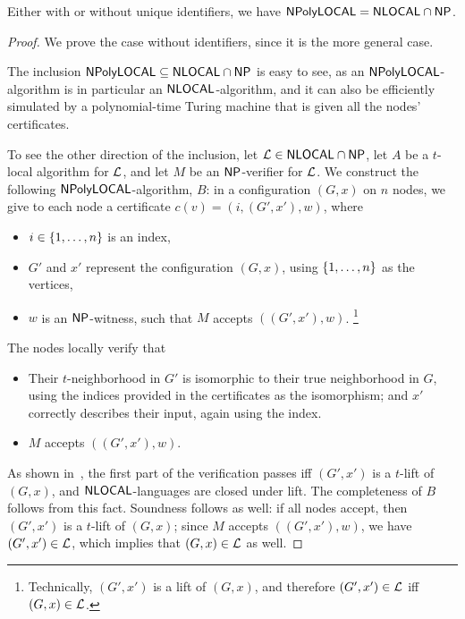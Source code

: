 \begin{theorem}
	Either with or without unique identifiers,
	we have $\mathsf{NPolyLOCAL} = {\mathsf{NLOCAL}} \cap {\mathsf{NP}}$.
	\label{thm:NPLD}
\end{theorem}
\begin{proof}
	We prove the case without identifiers, since it is the more general case.

	The inclusion $\mathsf{NPolyLOCAL} \subseteq {\mathsf{NLOCAL}} \cap {\mathsf{NP}}$
	is easy to see, as an $\mathsf{NPolyLOCAL}$-algorithm is in particular an ${\mathsf{NLOCAL}}$-algorithm,
	and it can also be efficiently simulated by a polynomial-time Turing machine that is given all the nodes' certificates.

	To see the other direction of the inclusion, let $\mathcal{L} \in {\mathsf{NLOCAL}} \cap {\mathsf{NP}}$,
	let $A$ be a $t$-local algorithm for $\mathcal{L}$, and let $M$ be an ${\mathsf{NP}}$-verifier for $\mathcal{L}$.
	We construct the following $\mathsf{NPolyLOCAL}$-algorithm, $B$:
	in a configuration $(G, x)$ on $n$ nodes,
	we give to each node a certificate $c(v) = ( i, (G', x'), w)$,
	where
	\begin{itemize}
		\item $i \in \left \{{1,\ldots,n} \right \}$ is an index,
		\item $G'$ and $x'$ represent the configuration $(G,x)$, using $\left \{{1,\ldots,n} \right \}$ as the vertices,
		\item $w$ is an ${\mathsf{NP}}$-witness, such that $M$ accepts $( (G', x'), w )$.%
			\footnote{Technically, $(G', x')$ is a lift of $(G, x)$, and therefore  
			$(G', x') \in \mathcal{L}$ iff $(G, x) \in \mathcal{L}$.}
	\end{itemize}
	The nodes locally verify that
	\begin{itemize}
		\item Their $t$-neighborhood in $G'$ is isomorphic to their true neighborhood in $G$,
			using the indices provided in the certificates as the isomorphism;
			and $x'$ correctly describes their input, again using the index.
		\item $M$ accepts $( (G', x'), w)$.
	\end{itemize}
	As shown in~\cite{fraigniaud2013can},
	the first part of the verification passes iff $(G', x')$ is a $t$-lift of $(G, x)$,
	and ${\mathsf{NLOCAL}}$-languages are closed under lift.
	The completeness of $B$ follows from this fact.
	Soundness follows as well:
	if all nodes accept, then $(G', x')$ is a $t$-lift of $(G, x)$;
	since $M$ accepts $( (G', x'), w)$, we have $(G', x') \in \mathcal{L}$,
	which implies that $(G, x) \in \mathcal{L}$ as well.
\end{proof}


